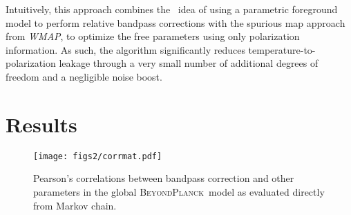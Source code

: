 \documentclass[twocolumn]{aa}
\def\WMAP{\textit{WMAP}}
\newcommand{\BP}{\textsc{BeyondPlanck}}
\newcommand{\?}[1]{\textcolor{red}{{\bf [#1]}}}
\begin{document}
Intuitively, this approach combines the \Planck\ idea of using a
parametric foreground model to perform relative bandpass corrections
with the spurious map approach from \WMAP, to optimize the
free parameters using only polarization information. As such, the
algorithm significantly reduces temperature-to-polarization
leakage through a very small number of additional degrees of freedom
and a negligible noise boost.


\section{Results}
\label{sec:results}

  \begin{figure}[t] %
    \center
    \texttt{[image: figs2/corrmat.pdf]}
    \caption{Pearson's correlations between bandpass correction
    and other parameters in the global \BP\ model as evaluated
    directly from Markov chain.} 
    \label{fig:correlations}
  \end{figure}
  
\end{document}
